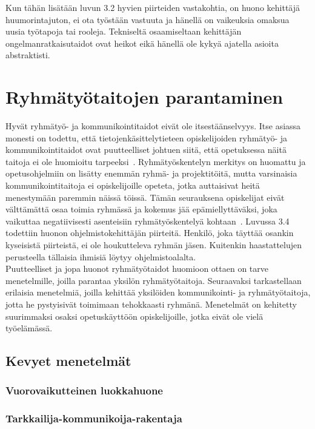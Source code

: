 \documentclass[finnish]{../tktltiki2}
\theoremstyle{definition}
\theoremstyle{remark}
\begin{document}
Kun tähän lisätään luvun 3.2 hyvien piirteiden vastakohtia, on huono kehittäjä huumorintajuton, ei ota työstään vastuuta ja hänellä on vaikeuksia omaksua uusia työtapoja tai rooleja. Tekniseltä osaamiseltaan kehittäjän ongelmanratkaisutaidot ovat heikot eikä hänellä ole kykyä ajatella asioita abstraktisti.

\section{Ryhmätyötaitojen parantaminen}

Hyvät ryhmätyö- ja kommunikointitaidot eivät ole itsestäänselvyys. Itse asiassa monesti on todettu, että
tietojenkäsittelytieteen opiskelijoiden ryhmätyö- ja kommunikointitaidot ovat puutteelliset johtuen siitä, että opetuksessa näitä taitoja ei ole huomioitu tarpeeksi~\cite{Cushing:2003:TBP:948785.948797,5593527,Waite:2004:SCV:1028174.971308}. Ryhmätyöskentelyn merkitys on huomattu ja
opetusohjelmiin on lisätty enemmän ryhmä- ja projektitöitä, mutta varsinaisia kommunikointitaitoja ei opiskelijoille opeteta, jotka auttaisivat
heitä menestymään paremmin näissä töissä. Tämän seurauksena opiskelijat eivät välttämättä osaa toimia ryhmässä ja kokemus jää epämiellyttäväksi, joka vaikuttaa negatiivisesti asenteisiin ryhmätyöskentelyä kohtaan~\cite{1158709}.
Luvussa 3.4 todettiin huonon ohjelmistokehittäjän piirteitä. Henkilö, joka täyttää osankin kyseisistä piirteistä, ei ole houkutteleva ryhmän jäsen. Kuitenkin haastattelujen perusteella tällaisia ihmisiä löytyy ohjelmistoalalta.\\

Puutteelliset ja jopa huonot ryhmätyötaidot huomioon ottaen on tarve menetelmille, joilla parantaa yksilön ryhmätyötaitoja.
Seuraavaksi tarkastellaan erilaisia menetelmiä, joilla
kehittää yksilöiden kommunikointi- ja ryhmätyötaitoja, jotta he pystyisivät toimimaan tehokkaasti ryhmänä. Menetelmät on
kehitetty suurimmaksi osaksi opetuskäyttöön opiskelijoille,
jotka eivät ole vielä työelämässä.

\subsection{Kevyet menetelmät}

\subsubsection{Vuorovaikutteinen luokkahuone}

\subsubsection{Tarkkailija-kommunikoija-rakentaja}
\end{document}
